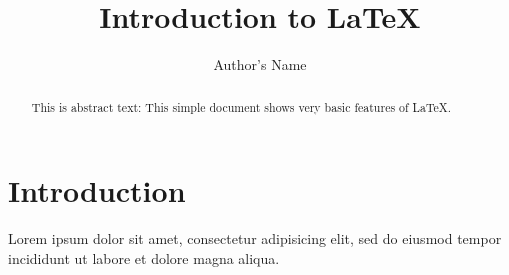 \documentclass{article}
\begin{document}
\title{Introduction to \LaTeX{}}
\author{Author's Name}

\maketitle

\begin{abstract}
This is abstract text: This simple document shows very basic features of
\LaTeX{}.
\end{abstract}

\section{Introduction}

Lorem ipsum dolor sit amet, consectetur adipisicing elit, sed do eiusmod tempor
incididunt ut labore et dolore magna aliqua.
\end{document}
